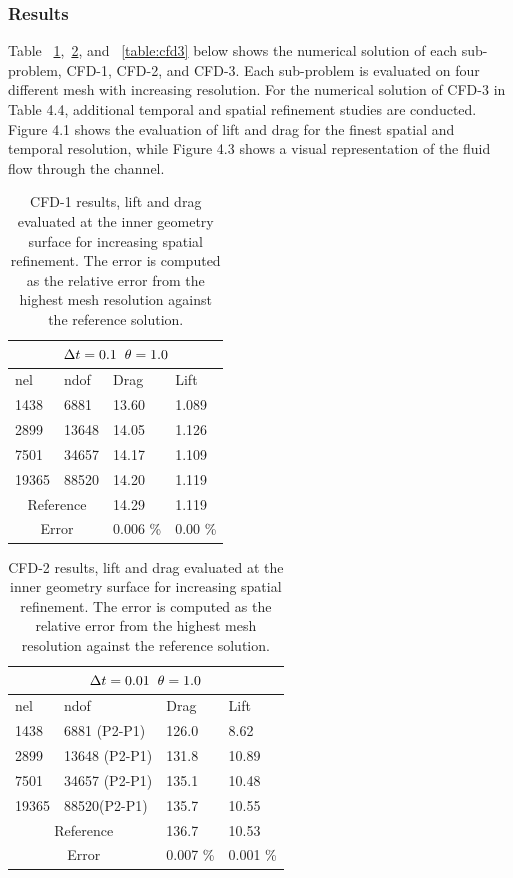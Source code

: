 \subsubsection*{Results}
Table ~\ref{table:cfd1},~\ref{table:cfd2}, and ~\ref{table:cfd3} below shows the numerical solution of each sub-problem, CFD-1, CFD-2, and CFD-3. Each sub-problem is evaluated on four different mesh with increasing resolution. For the numerical solution of CFD-3 in Table 4.4, additional temporal and spatial refinement studies are conducted. Figure 4.1 shows the evaluation of lift and drag for the finest spatial and temporal resolution, while Figure 4.3 shows a visual representation of the fluid flow through the channel. 
\begin{table}[h!]
\centering
\begin{tabular}{ |p{1cm}||p{2.7cm}|p{3.3cm}|p{3.3cm}|}
\hline
  \multicolumn{4}{|c|}{$\Delta t = 0.1 \hspace{2mm} \theta = 1.0$} \\
\hline
nel & ndof & Drag  & Lift \\
\hline
 1438    & 6881   & 13.60 & 1.089  \\
 2899    & 13648  & 14.05 & 1.126 \\
 7501    & 34657  & 14.17   & 1.109 \\
 19365   & 88520  & 14.20 & 1.119 \\
  \hline
  \multicolumn{2}{|c|}{Reference}  & 14.29   & 1.119\\
   \hline
    \multicolumn{2}{|c|}{Error}  & 0.006 \%   & 0.00 \%\\
   \hline
\end{tabular}
\caption{CFD-1 results, lift and drag evaluated at the inner geometry surface for increasing spatial refinement. The error is computed as the relative error from the highest mesh resolution against the reference solution.}
\label{table:cfd1}
\end{table}
\newpage
\begin{table}[h!]
\centering
\label{CFD-2 Results}
\begin{tabular}{ |p{1cm}||p{2.7cm}|p{3.3cm}|p{3.3cm}|}
 \hline
  \multicolumn{4}{|c|}{$\Delta t = 0.01 \hspace{2mm} \theta = 1.0$} \\
   \hline
nel & ndof & Drag  & Lift \\
\hline
 1438    & 6881 (P2-P1)  & 126.0 &  8.62 \\
 2899    & 13648  (P2-P1)& 131.8 & 10.89  \\
 7501    & 34657 (P2-P1) & 135.1 & 10.48  \\
 19365   & 88520(P2-P1)  & 135.7 & 10.55  \\
 \hline
  \multicolumn{2}{|c|}{Reference}  & 136.7   & 10.53\\
   \hline
    \multicolumn{2}{|c|}{Error}  & 0.007 \%   & 0.001 \%\\
   \hline
\end{tabular}
\caption{CFD-2 results, lift and drag evaluated at the inner geometry surface for increasing spatial refinement. The error is computed as the relative error from the highest mesh resolution against the reference solution.}
\label{table:cfd2}
\end{table}
